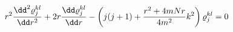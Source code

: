 \begin{equation}
r^2{\dd^2\varrho^{kl}_j\over\dd r^2}+2r{\dd\varrho^{kl}_j\over\dd
r}-\left( j(j+1)+{r^2+4mNr\over 4m^2}k^2\right)\varrho^{kl}_j=0
\label{radial2}
\end{equation}

